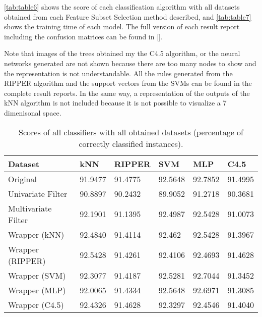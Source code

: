 \documentclass[a4paper,11pt]{article}
\begin{document}
\autoref{tab:table6} shows the score of each classification algorithm with all datasets obtained from each Feature Subset Selection method described, and \autoref{tab:table7} shows the training time of each model. The full version of each result report including the confusion matrices can be found in [].

Note that images of the trees obtained my the C4.5 algorithm, or the neural networks generated are not shown because there are too many nodes to show and the representation is not understandable. All the rules generated from the RIPPER algorithm and the support vectors from the SVMs can be found in the complete result reports. In the same way, a representation of the outputs of the kNN algorithm is not included because it is not possible to visualize a 7 dimenisonal space.

\begin{table}[h]
\centering
\begin{tabular}{||l|l|l|l|l|l||}
	\hline
	Dataset & kNN & RIPPER & SVM & MLP & C4.5\\
	\hline
	Original & 91.9477 & 91.4775 & 92.5648 & 92.7852 & 91.4995\\
	Univariate Filter & 90.8897 & 90.2432 & 89.9052 & 91.2718 & 90.3681\\
	Multivariate Filter & 92.1901 & 91.1395 & 92.4987 & 92.5428 & 91.0073\\
	Wrapper (kNN) & 92.4840 & 91.4114 & 92.462 & 92.5428 & 91.3967\\
	Wrapper (RIPPER) & 92.5428 & 91.4261 & 92.4106 & 92.4693 & 91.4628\\
	Wrapper (SVM) & 92.3077 & 91.4187 & 92.5281 & 92.7044 & 91.3452\\
	Wrapper (MLP) & 92.0065 & 91.4334 & 92.5648 & 92.6971 & 91.3085\\
	Wrapper (C4.5) & 92.4326 & 91.4628 & 92.3297 & 92.4546 & 91.4040\\
    \hline 
\end{tabular}
\caption{Scores of all classifiers with all obtained datasets (percentage of correctly classified instances).}
\label{tab:table6}
\end{table}
\end{document}
